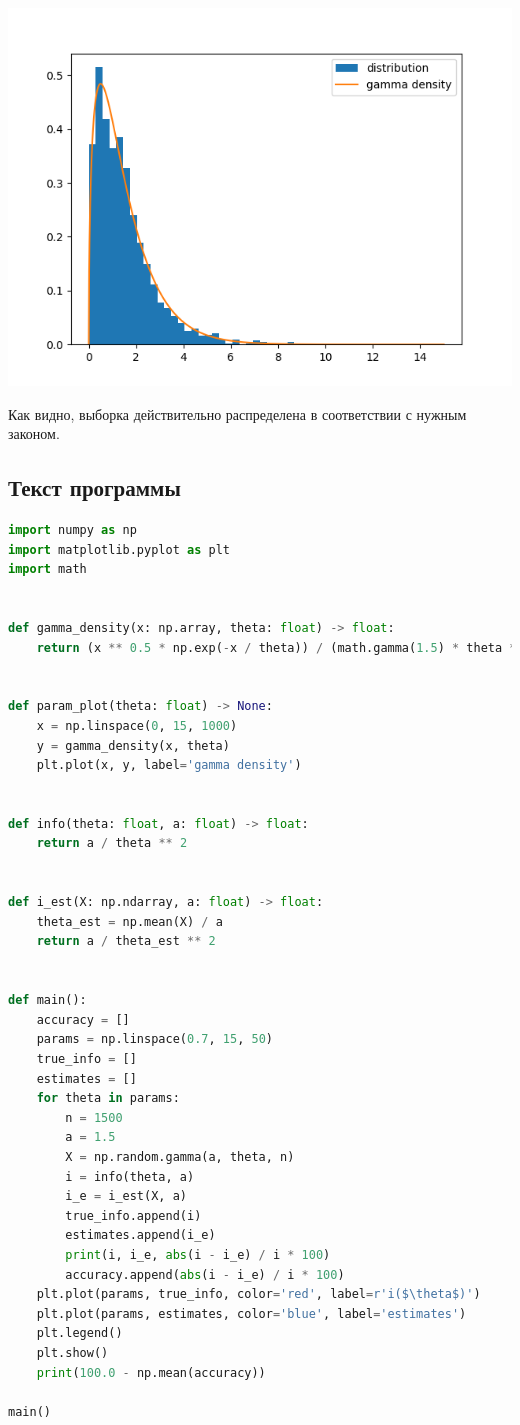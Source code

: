 \documentclass{article}
\begin{document}
    \includegraphics[scale=0.5]{gamma}

    Как видно, выборка действительно распределена в соответствии с нужным законом.

    \subsection{Текст программы}

    \lstset{style=mystyle}
    \begin{lstlisting}[language=Python]
import numpy as np
import matplotlib.pyplot as plt
import math


def gamma_density(x: np.array, theta: float) -> float:
    return (x ** 0.5 * np.exp(-x / theta)) / (math.gamma(1.5) * theta ** 1.5)


def param_plot(theta: float) -> None:
    x = np.linspace(0, 15, 1000)
    y = gamma_density(x, theta)
    plt.plot(x, y, label='gamma density')


def info(theta: float, a: float) -> float:
    return a / theta ** 2


def i_est(X: np.ndarray, a: float) -> float:
    theta_est = np.mean(X) / a
    return a / theta_est ** 2


def main():
    accuracy = []
    params = np.linspace(0.7, 15, 50)
    true_info = []
    estimates = []
    for theta in params:
        n = 1500
        a = 1.5
        X = np.random.gamma(a, theta, n)
        i = info(theta, a)
        i_e = i_est(X, a)
        true_info.append(i)
        estimates.append(i_e)
        print(i, i_e, abs(i - i_e) / i * 100)
        accuracy.append(abs(i - i_e) / i * 100)
    plt.plot(params, true_info, color='red', label=r'i($\theta$)')
    plt.plot(params, estimates, color='blue', label='estimates')
    plt.legend()
    plt.show()
    print(100.0 - np.mean(accuracy))

main()
    \end{lstlisting}
\end{document}
